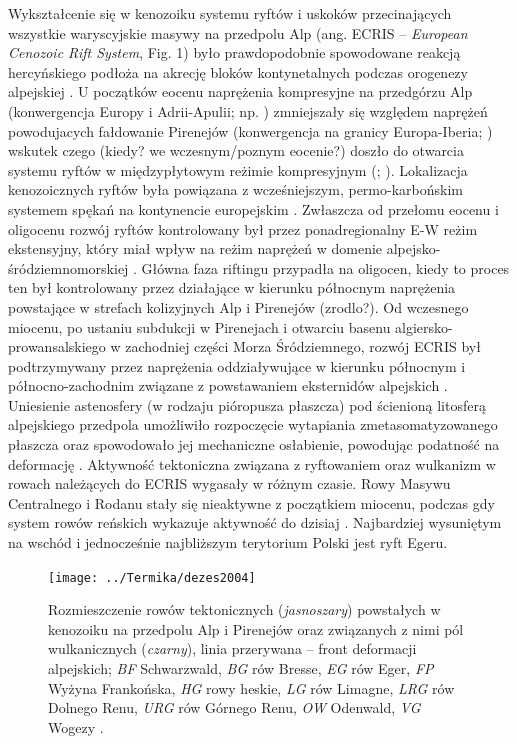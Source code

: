 \documentclass[11.5pt,twoside]{report}
\begin{document}
	
Wykształcenie się w kenozoiku systemu ryftów i uskoków przecinających wszystkie waryscyjskie masywy na przedpolu Alp (ang. ECRIS -- \textit{European Cenozoic Rift System}, Fig. 1) było prawdopodobnie spowodowane reakcją hercyńskiego podłoża na akrecję bloków kontynetalnych podczas orogenezy alpejskiej \parencite{Ulrych.2002}. U początków eocenu naprężenia kompresyjne na przedgórzu Alp (konwergencja Europy i Adrii-Apulii; np. \cite{Sissingh.2006a}) zmniejszały się względem naprężeń powodujacych fałdowanie Pirenejów (konwergencja na granicy Europa-Iberia; \cite{Rosenbaum.2002}) wskutek czego (kiedy? we wczesnym/poznym eocenie?) doszło do otwarcia systemu ryftów w międzypłytowym reżimie kompresyjnym (\cite{Ziegler.2007}; \cite{Dezes.2004}). Lokalizacja kenozoicznych ryftów była powiązana z wcześniejszym, permo-karbońskim systemem spękań na kontynencie europejskim \parencite{Wilson.2006,Sissingh.2006a}. Zwłaszcza od przełomu eocenu i oligocenu rozwój ryftów kontrolowany był przez ponadregionalny E-W reżim ekstensyjny, który miał wpływ na reżim naprężeń w domenie alpejsko-śródziemnomorskiej \parencite{Sissingh.2006a}. Główna faza riftingu przypadła na oligocen, kiedy to proces ten był kontrolowany przez działające w kierunku północnym naprężenia powstające w strefach kolizyjnych Alp i Pirenejów (zrodlo?). Od wczesnego miocenu, po ustaniu subdukcji w Pirenejach i otwarciu basenu algiersko-prowansalskiego w zachodniej części Morza Śródziemnego, rozwój ECRIS był podtrzymywany przez naprężenia oddziaływujące w kierunku północnym i północno-zachodnim związane z powstawaniem eksternidów alpejskich \parencite{Dezes.2004}. Uniesienie astenosfery (w rodzaju pióropusza płaszcza) pod ścienioną litosferą alpejskiego przedpola umożliwiło rozpoczęcie wytapiania zmetasomatyzowanego płaszcza \parencite{Ulrych.2002} oraz spowodowało jej mechaniczne osłabienie, powodując podatność na deformację \parencite{Dezes.2004}. Aktywność tektoniczna związana z ryftowaniem oraz wulkanizm w rowach należących do ECRIS wygasały w różnym czasie. Rowy Masywu Centralnego i Rodanu stały się nieaktywne z początkiem miocenu, podczas gdy system rowów reńskich wykazuje aktywność do dzisiaj \parencite{Dezes.2004}. Najbardziej wysuniętym na wschód i jednocześnie najbliższym terytorium Polski jest ryft Egeru.


\begin{figure}[h]
	\centering
	\texttt{[image: ../Termika/dezes2004]}
	\caption{Rozmieszczenie rowów tektonicznych (\textit{jasnoszary}) powstałych w kenozoiku na przedpolu Alp i Pirenejów oraz związanych z nimi pól wulkanicznych (\textit{czarny}), linia przerywana -- front deformacji alpejskich; \textit{BF} Schwarzwald, \textit{BG} rów Bresse, \textit{EG} rów Eger, \textit{FP} Wyżyna Frankońska, \textit{HG} rowy heskie, \textit{LG} rów Limagne, \textit{LRG} rów Dolnego Renu, \textit{URG} rów Górnego Renu, \textit{OW} Odenwald, \textit{VG} Wogezy \parencite{Dezes.2004}.}
\label{Fig.}
\end{figure}
\end{document}
